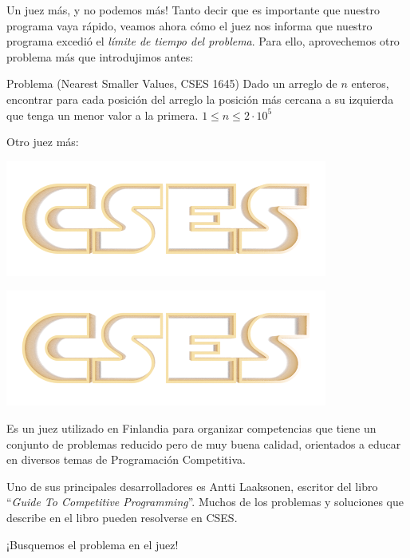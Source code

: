\documentclass{beamer}
\begin{document}
    \begin{frame}{Un juez más, y no podemos más!}
        Tanto decir que es importante que nuestro programa vaya rápido, veamos ahora cómo el juez nos informa que nuestro programa excedió el \textit{límite de tiempo del problema}. Para ello, aprovechemos otro problema más que introdujimos antes: \pause

        \begin{block}{Problema (Nearest Smaller Values, CSES 1645)}
            Dado un arreglo de $n$ enteros, encontrar para cada posición del arreglo la posición más cercana a su izquierda que tenga un menor valor a la primera. $1 \leq n \leq 2 \cdot 10^5$
        \end{block} \pause

        Otro juez más:\pause
        \begin{center}
            \href{https://cses.fi/}{\includegraphics[width=.4\linewidth]{./res/cses_logo.png}}
        \end{center} 
    \end{frame}

    \begin{frame}[noframenumbering]
        \begin{center}
            \href{https://cses.fi/}{\includegraphics[width=.4\linewidth]{./res/cses_logo.png}}
        \end{center} \pause

        Es un juez utilizado en Finlandia para organizar competencias que tiene un conjunto de problemas reducido pero de muy buena calidad, orientados a educar en diversos temas de Programación Competitiva. \pause \vspace{4pt}

        Uno de sus principales desarrolladores es Antti Laaksonen, escritor del libro ``\textit{Guide To Competitive Programming}''. Muchos de los problemas y soluciones que describe en el libro pueden resolverse en CSES. \pause

        \begin{center}
            \LARGE
            ¡Busquemos el problema en el juez!
        \end{center}
    \end{frame}
\end{document}
